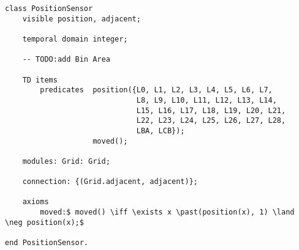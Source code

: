 \begin{lstlisting}[fontadjust, mathescape, frame=single] 
class PositionSensor
    visible position, adjacent;

    temporal domain integer;

    -- TODO:add Bin Area

    TD items 
        predicates  position({L0, L1, L2, L3, L4, L5, L6, L7,
                              L8, L9, L10, L11, L12, L13, L14,
                              L15, L16, L17, L18, L19, L20, L21,
                              L22, L23, L24, L25, L26, L27, L28,
                              LBA, LCB});
                    moved();

    modules: Grid: Grid;

    connection: {(Grid.adjacent, adjacent)};

    axioms
        moved:$ moved() \iff \exists x \past(position(x), 1) \land \neg position(x);$

end PositionSensor.\end{lstlisting}